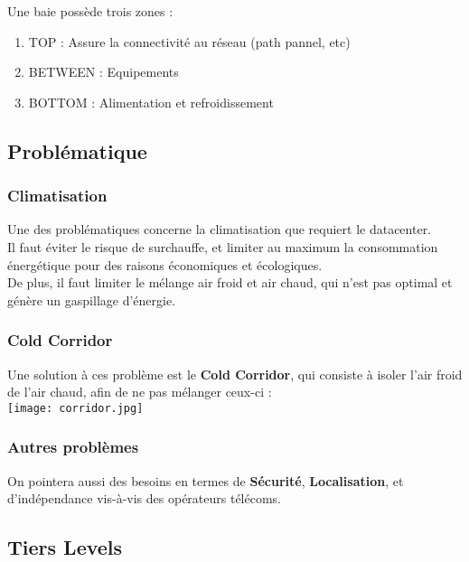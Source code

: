 \documentclass{report}
\begin{document}
			Une baie possède trois zones : \\

			\begin{enumerate}
				\item TOP : Assure la connectivité au réseau (path pannel, etc)
				\item BETWEEN : Equipements
				\item BOTTOM : Alimentation et refroidissement\\
			\end{enumerate}

		\subsection{Problématique}

			\subsubsection{Climatisation}

				Une des problématiques concerne la climatisation que requiert le datacenter.\\
				Il faut éviter le risque de surchauffe, et limiter au maximum la consommation énergétique pour des raisons économiques et écologiques.\\
				De plus, il faut limiter le mélange air froid et air chaud, qui n'est pas optimal et génère un gaspillage d'énergie.\\

			\subsubsection{Cold Corridor}

				Une solution à ces problème est le \textbf{Cold Corridor}, qui consiste à isoler l'air froid de l'air chaud, afin de ne pas mélanger ceux-ci : \\

				\texttt{[image: corridor.jpg]}

			\subsubsection{Autres problèmes}

				On pointera aussi des besoins en termes de \textbf{Sécurité}, \textbf{Localisation}, et d'indépendance vis-à-vis des opérateurs télécoms.\\

		\subsection{Tiers Levels}
\end{document}
